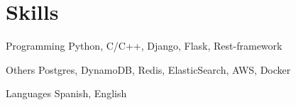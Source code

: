
\section{Skills}

  \cvitem
    {Programming}
    {Python, C/C++, Django, Flask, Rest-framework}

  \cvitem
    {Others}
    {Postgres, DynamoDB, Redis, ElasticSearch, AWS, Docker}

  \cvitem
    {Languages} %
    {Spanish, English} %


